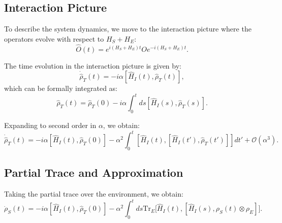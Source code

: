 
\subsection{Interaction Picture}

To describe the system dynamics, we move to the interaction picture where the operators evolve with respect to $H_S + H_E$:
\begin{equation}
    \hat{O}(t) = e^{i(H_S+H_E)t} O e^{-i(H_S+H_E)t}.
    \label{eq:interaction_picture}
\end{equation}

The time evolution in the interaction picture is given by:
\begin{equation}
    \dot{\hat{\rho}}_T(t) = -i \alpha [\hat{H}_I(t), \hat{\rho}_T(t)],
    \label{eq:interaction_evolution}
\end{equation}
which can be formally integrated as:
\begin{equation}
    \hat{\rho}_T(t) = \hat{\rho}_T(0) - i \alpha \int_0^t ds [\hat{H}_I(s), \hat{\rho}_T(s)].
    \label{eq:formal_integration}
\end{equation}

Expanding to second order in $\alpha$, we obtain:
\begin{equation}
    \dot{\hat{\rho}}_T(t) = -i \alpha \left[ \hat{H}_I(t), \hat{\rho}_T(0) \right] 
    - \alpha^2 \int_0^t \left[ \hat{H}_I(t), \left[ \hat{H}_I(t'), \hat{\rho}_T(t') \right] \right] dt' + \mathcal{O} (\alpha^3).
    \label{eq:second_order_expansion}
\end{equation}


\subsection{Partial Trace and Approximation}

Taking the partial trace over the environment, we obtain:
\begin{equation}
    \dot{\rho}_S(t) = -i \alpha [\hat{H}_I(t),\hat{\rho}_T(0)]  
    - \alpha^2 \int_0^t ds \mathrm{Tr}_E \big[\hat{H}_I(t), [\hat{H}_I(s), \rho_S(t) \otimes \rho_E]\big].
    \label{eq:partial_trace}
\end{equation}

